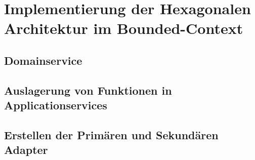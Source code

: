 \chapter{Implementierung der Hexagonalen Architektur im Bounded-Context}

\section{Domainservice} %
\blindtext

\section{Auslagerung von Funktionen in Applicationservices}
\blindtext

\section{Erstellen der Primären und Sekundären Adapter}
\blindtext